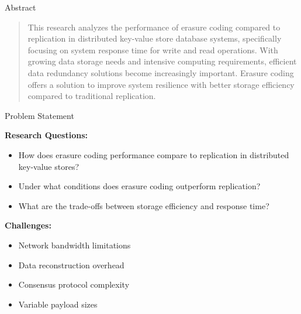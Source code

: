 \documentclass[a2,portrait]{config/poster/a0poster}
\newcommand{\postersection}[1]{%
	\begin{tcolorbox}[
			colback=ITBblue,
			colframe=ITBblue,
			fonttitle=\bfseries,
			coltext=white,
			sharp corners,
			boxrule=0pt,
			top=0pt,
			bottom=0pt,
			halign=center
		]
		\normalsize #1
	\end{tcolorbox}%
}
\begin{document}
\begin{multicols}{4} %
	\vspace{0.1cm}

\newcommand{\twocolimg}[2]{%
	\begin{center}
			\parbox{0.48\textwidth\relax}{%
				\centering
				\texttt{[image: \#1]}
				\captionof{figure}{#2}
			}
	\end{center}
}


	\postersection{Abstract}
	\begin{quote}
		This research analyzes the performance of erasure coding compared to replication in distributed key-value store database systems, specifically focusing on system response time for write and read operations. With growing data storage needs and intensive computing requirements, efficient data redundancy solutions become increasingly important. Erasure coding offers a solution to improve system resilience with better storage efficiency compared to traditional replication.
	\end{quote}


	\postersection{Problem Statement}
	
	\textbf{Research Questions:}
	\begin{itemize}
		\item How does erasure coding performance compare to replication in distributed key-value stores?
		\item Under what conditions does erasure coding outperform replication?
		\item What are the trade-offs between storage efficiency and response time?
	\end{itemize}

	\textbf{Challenges:}
	\begin{itemize}
		\item Network bandwidth limitations
		\item Data reconstruction overhead
		\item Consensus protocol complexity
		\item Variable payload sizes
	\end{itemize}


\end{multicols}
\end{document}
